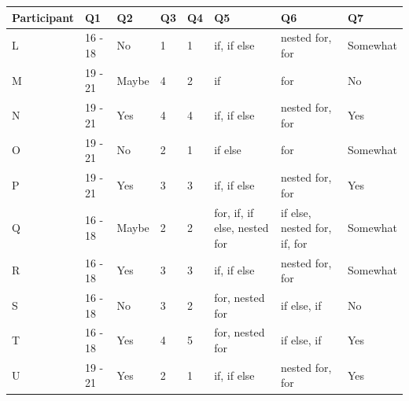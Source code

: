 \documentclass[a4paper,11.5pt]{report}
\numberwithin{figure}{section}
\numberwithin{table}{section}
\numberwithin{equation}{section}
\numberwithin{equation}{section}
\begin{document}
\begin{landscape}
\begin{table}[H]
\centering
\begin{tabular}{|l|l|l|l|l|l|l|l|} 
 \hline        Participant & Q1 & Q2 & Q3 & Q4 & Q5 & Q6 & Q7  \\ \hline
L&16 - 18	&No	&1	&1	&if, if else	&nested for, for	&Somewhat
\\ \hline
M&19 - 21	&Maybe	&4	&2	&if	&for	&No
\\ \hline
N&19 - 21	&Yes	&4	&4	&if, if else	&nested for, for	&Yes
\\ \hline
O&19 - 21	&No	&2	&1	&if else	&for	&Somewhat
\\ \hline
P&19 - 21	&Yes	&3	&3	&if, if else	&nested for, for	&Yes
\\ \hline
Q&16 - 18	&Maybe	&2	&2	&for, if, if else, nested for	&if else, nested for, if, for	&Somewhat
\\ \hline
R&16 - 18	&Yes	&3	&3	&if, if else	&nested for, for	&Somewhat
\\ \hline
S&16 - 18	&No	&3	&2	&for, nested for	&if else, if	&No
\\ \hline
T&16 - 18	&Yes	&4	&5	&for, nested for	&if else, if	&Yes
\\ \hline
U&19 - 21	&Yes	&2	&1	&if, if else	&nested for, for	&Yes
\\ \hline
\end{tabular}
\end{table}




\end{landscape}
\end{document}
